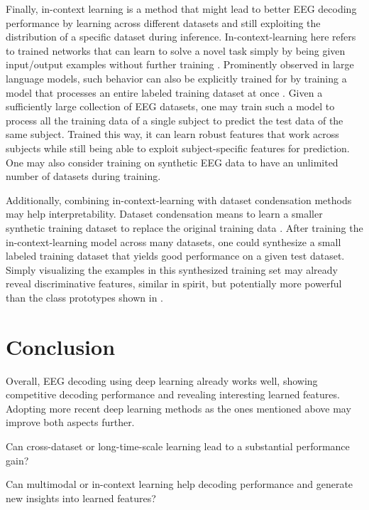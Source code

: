 Finally, in-context learning is a method that might lead to better
EEG decoding performance by learning across different datasets and still
exploiting the distribution of a specific dataset during inference.
In-context-learning here refers to trained networks that can learn to solve a
novel task simply by being given input/output examples without further
training
\citep{DBLP:conf/iclr/XieRL022,DBLP:conf/emnlp/MinLHALHZ22,DBLP:conf/iclr/0005HPGH22}.
Prominently observed in large language models, such behavior can also be
explicitly trained for by training a model that processes an entire labeled training dataset at once \citep{DBLP:conf/iclr/0005HPGH22,tabpfn}.
Given a sufficiently large collection of EEG datasets, one may train such a model to
process all the training data of a single subject to predict the test
data of the same subject. Trained this way, it can learn robust features
that work across subjects while still being able to exploit
subject-specific features for prediction. One may also consider training
on synthetic EEG data to have an unlimited number of datasets during
training.

Additionally, combining in-context-learning with dataset condensation
methods may help interpretability. Dataset condensation means to learn a
smaller synthetic training dataset to replace the original training data
\citep{DBLP:conf/icml/MaclaurinDA15,DBLP:conf/iclr/ZhaoMB21,DBLP:conf/icml/ZhaoB21,DBLP:journals/corr/abs-1811-10959}.
After training the in-context-learning model across many datasets, one
could synthesize a small labeled training dataset that yields good
performance on a given test dataset. Simply visualizing the examples in
this synthesized training set may already reveal discriminative
features, similar in spirit, but potentially more powerful than the
class prototypes shown in .

\section{Conclusion}\label{conclusion}

Overall, EEG decoding using deep learning already works well, showing
competitive decoding performance and revealing interesting learned
features. Adopting more recent deep learning methods as the ones
mentioned above may improve both aspects further.


\begin{openbox}
\item Can cross-dataset or long-time-scale learning lead to a substantial performance gain?
\item Can multimodal or in-context learning help decoding performance and generate new insights into learned features?
\end{openbox}
